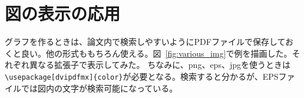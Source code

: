 \documentclass[a4j,openany,11px]{jsbook}
\begin{document}
\section{図の表示の応用}

グラフを作るときは、論文内で検索しやすいようにPDFファイルで保存しておくと良い。他の形式ももちろん使える。図~\ref{fig:various_img}で例を描画した。それぞれ異なる拡張子で表示してみた。
ちなみに、png、eps、jpgを使うときは\verb|\usepackage[dvipdfmx]{color}|が必要となる。検索すると分かるが、EPSファイルでは図内の文字が検索可能になっている。

\begin{figure}[htbp]
\centering
{}

\end{figure}
\end{document}
